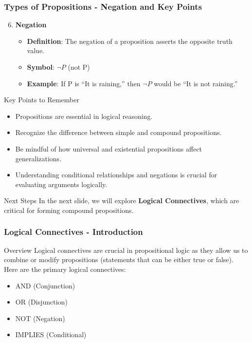 \documentclass[aspectratio=169]{beamer}
\begin{document}
\begin{frame}[fragile]
    \frametitle{Types of Propositions - Negation and Key Points}
    \begin{enumerate}
        \setcounter{enumi}{5}
        \item \textbf{Negation}
            \begin{itemize}
                \item \textbf{Definition}: The negation of a proposition asserts the opposite truth value.
                \item \textbf{Symbol}: $\neg P$ (not P)
                \item \textbf{Example}: If P is ``It is raining,'' then $\neg P$ would be ``It is not raining.''
            \end{itemize}
    \end{enumerate}
    
    \begin{block}{Key Points to Remember}
        \begin{itemize}
            \item Propositions are essential in logical reasoning.
            \item Recognize the difference between simple and compound propositions.
            \item Be mindful of how universal and existential propositions affect generalizations.
            \item Understanding conditional relationships and negations is crucial for evaluating arguments logically.
        \end{itemize}
    \end{block}
    
    \begin{block}{Next Steps}
        In the next slide, we will explore \textbf{Logical Connectives}, which are critical for forming compound propositions.
    \end{block}
\end{frame}

\begin{frame}[fragile]
    \frametitle{Logical Connectives - Introduction}
    \begin{block}{Overview}
        Logical connectives are crucial in propositional logic as they allow us to combine or modify propositions (statements that can be either true or false). Here are the primary logical connectives:
    \end{block}
    
    \begin{itemize}
        \item AND (Conjunction)
        \item OR (Disjunction)
        \item NOT (Negation)
        \item IMPLIES (Conditional)
    \end{itemize}
\end{frame}
\end{document}

